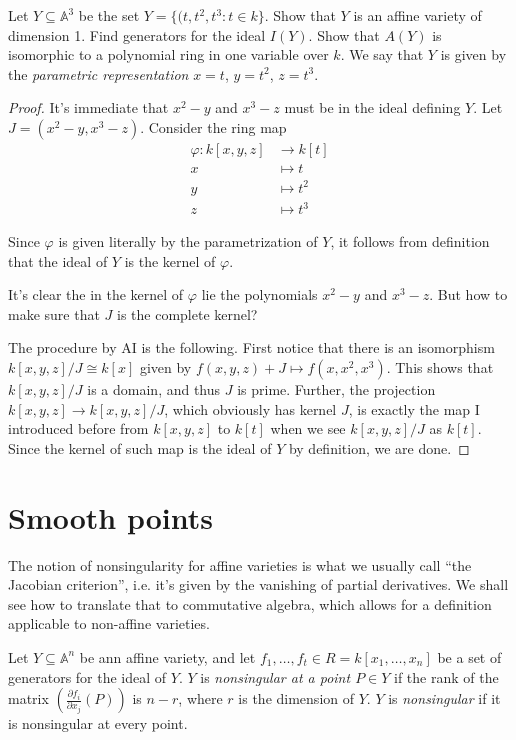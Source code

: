 \begin{exercise}
\label{exercise-affine-twisted-cubic}
Let $Y\subseteq \mathbb{A}^3$ be the set
$Y= \{(t,t^2,t^3:t \in k\}$.
Show that $Y$ is an affine variety of
dimension 1.
Find generators for the ideal $I(Y)$.
Show that $A(Y)$ is isomorphic to a
polynomial ring in one variable over $k$.
We say that $Y$ is given by the {\it
parametric representation}
$x=t$, $y=t^2$, $z=t^3$.
\end{exercise}

\begin{proof}
It's immediate that $x^2-y$ and $x^3-z$ must
be in
the ideal defining $Y$. Let
$J=(x^2-y,x^3-z)$.
Consider the ring map
$$
\begin{aligned}
\varphi:k[x,y,z] &\longrightarrow k[t] \\
x &\longmapsto t\\
y &\longmapsto t^2\\
z &\longmapsto t^3
\end{aligned}
$$

\noindent
Since $\varphi$ is given literally by the
parametrization of $Y$,
it follows from definition that the ideal of
$Y$
is the kernel of $\varphi$.

It's clear the in the kernel of $\varphi$
lie the polynomials $x^2-y$ and $x^3-z$.
But how to make sure that $J$ is the complete
kernel?

The procedure by AI is the following.
First notice that there is an isomorphism
$k[x,y,z]/J \cong k[x]$
given by $f(x,y,z)+J \mapsto f(x,x^2,x^3)$.
This shows that $k[x,y,z]/J$ is a domain, and
thus $J$ is prime.
Further, the projection $k[x,y,z] \to
k[x,y,z]/J$,
which obviously has kernel $J$,
is exactly the map I introduced before from
$k[x,y,z]$ to $k[t]$ when we see $k[x,y,z]/J$
as $k[t]$.
Since the kernel of such map is the ideal of
$Y$ by definition,
we are done.
\end{proof}

\section{Smooth points}
\label{section-smooth-points}

\noindent
The notion of nonsingularity for affine
varieties is what we usually call
``the Jacobian criterion'',
i.e. it's given by the vanishing
of partial derivatives.
We shall see how to translate
that to commutative algebra,
which allows for a definition applicable
to non-affine varieties.

\begin{definition}
\label{definition-nonsingular-affine}
Let $Y \subseteq \mathbb{A}^n$ be ann affine
variety,
and let $f_1,…,f_t \in R=k[x_1,…,x_n]$ be a
set of generators
for the ideal of $Y$.
$Y$ is {\it nonsingular at a point $P \in Y$}
if the rank of the matrix
$\left(\frac{\partial f_i}{\partial
x_j}(P)\right)$
is $n-r$, where $r$ is the dimension of $Y$.
$Y$ is {\it nonsingular} if it is nonsingular
at every point.
\end{definition}


